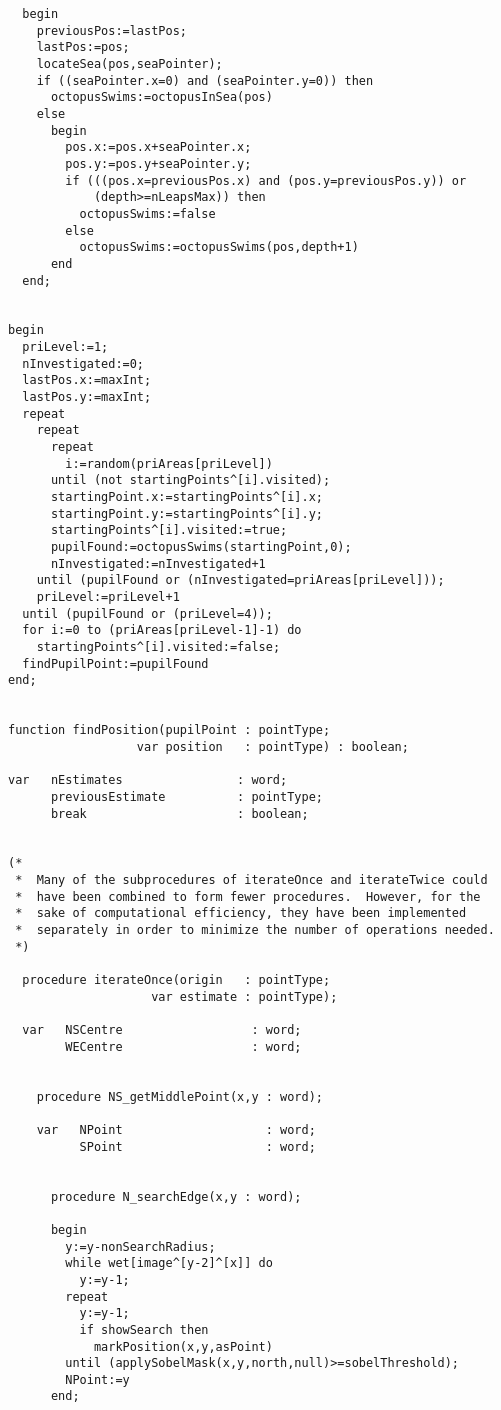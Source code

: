 \begin{verbatim}
  begin
    previousPos:=lastPos;
    lastPos:=pos;
    locateSea(pos,seaPointer);
    if ((seaPointer.x=0) and (seaPointer.y=0)) then
      octopusSwims:=octopusInSea(pos)
    else
      begin
        pos.x:=pos.x+seaPointer.x;
        pos.y:=pos.y+seaPointer.y;
        if (((pos.x=previousPos.x) and (pos.y=previousPos.y)) or
            (depth>=nLeapsMax)) then
          octopusSwims:=false
        else
          octopusSwims:=octopusSwims(pos,depth+1)
      end
  end;


begin
  priLevel:=1;
  nInvestigated:=0;
  lastPos.x:=maxInt;
  lastPos.y:=maxInt;
  repeat
    repeat
      repeat
        i:=random(priAreas[priLevel])
      until (not startingPoints^[i].visited);
      startingPoint.x:=startingPoints^[i].x;
      startingPoint.y:=startingPoints^[i].y;
      startingPoints^[i].visited:=true;
      pupilFound:=octopusSwims(startingPoint,0);
      nInvestigated:=nInvestigated+1
    until (pupilFound or (nInvestigated=priAreas[priLevel]));
    priLevel:=priLevel+1
  until (pupilFound or (priLevel=4));
  for i:=0 to (priAreas[priLevel-1]-1) do
    startingPoints^[i].visited:=false;
  findPupilPoint:=pupilFound
end;


function findPosition(pupilPoint : pointType;
                  var position   : pointType) : boolean;

var   nEstimates                : word;
      previousEstimate          : pointType;
      break                     : boolean;


(*
 *  Many of the subprocedures of iterateOnce and iterateTwice could
 *  have been combined to form fewer procedures.  However, for the
 *  sake of computational efficiency, they have been implemented
 *  separately in order to minimize the number of operations needed.
 *)

  procedure iterateOnce(origin   : pointType;
                    var estimate : pointType);

  var   NSCentre                  : word;
        WECentre                  : word;


    procedure NS_getMiddlePoint(x,y : word);

    var   NPoint                    : word;
          SPoint                    : word;


      procedure N_searchEdge(x,y : word);

      begin
        y:=y-nonSearchRadius;
        while wet[image^[y-2]^[x]] do
          y:=y-1;
        repeat
          y:=y-1;
          if showSearch then
            markPosition(x,y,asPoint)
        until (applySobelMask(x,y,north,null)>=sobelThreshold);
        NPoint:=y
      end;



\end{verbatim}
